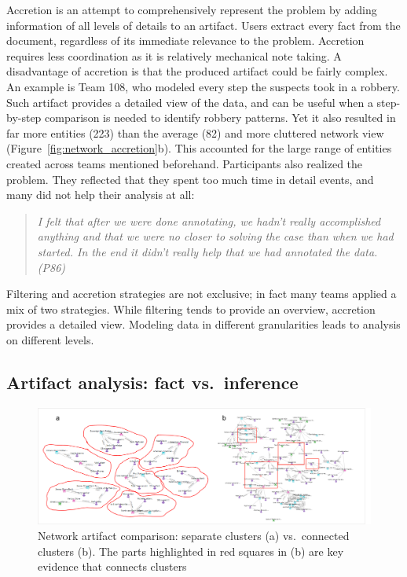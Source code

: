 Accretion is an attempt to comprehensively represent the problem by adding
information of all levels of details to an artifact. Users extract every fact
from the document, regardless of its immediate relevance to the problem.
Accretion requires less coordination as it is relatively mechanical note taking.
A disadvantage of accretion is that the produced artifact could be fairly
complex. An example is Team 108, who modeled every step the suspects took in a
robbery. Such artifact provides a detailed view of the data, and can be useful
when a step-by-step comparison is needed to identify robbery patterns. Yet it
also resulted in far more entities (223) than the average (82) and more
cluttered network view (Figure~\ref{fig:network_accretion}b). This accounted for
the large range of entities created across teams mentioned beforehand.
Participants also realized the problem. They reflected that they spent too much
time in detail events, and many did not help their analysis at all:

\begin{quote}
\emph{I felt that after we were done annotating, we hadn't really accomplished
anything and that we were no closer to solving the case than when we had
started. In the end it didn't really help that we had annotated the
data. (P86)}
\end{quote}

Filtering and accretion strategies are not exclusive; in fact many teams applied a mix of two strategies. While filtering tends to provide an overview, accretion provides a detailed view. Modeling data in different granularities leads to analysis on different levels. 

\subsection{Artifact analysis: fact
vs.~inference}\label{artifact-construction-fact-vs.inference}

\begin{figure}
\centering
\includegraphics[width=\columnwidth]{img/network_cluster.png}
\caption{Network artifact comparison: separate clusters (a)
vs.~connected clusters (b). The parts highlighted in red squares in (b) are key
evidence that connects clusters\label{fig:network_cluster}}
\end{figure}

